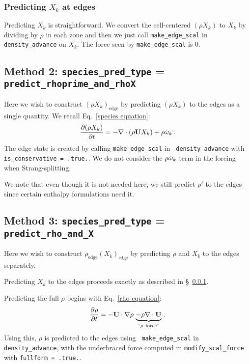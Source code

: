 \subsubsection{Predicting $X_k$ at edges}
\label{sec:pert:predict_X}
Predicting $X_k$ is straightforward.  We convert the cell-centered
$(\rho X_k)$ to $X_k$ by dividing by $\rho$ in each zone and then we
just call {\tt make\_edge\_scal} in {\tt density\_advance} on $X_k$.
The force seen by {\tt make\_edge\_scal} is 0.


\subsection{Method 2: {\tt species\_pred\_type} = {\tt predict\_rhoprime\_and\_rhoX}}

Here we wish to construct $(\rho X_k)_\mathrm{edge}$ by predicting
$(\rho X_k)$ to the edges as a single quantity.  We recall
Eq.~\ref{species equation}:
\begin{equation}
\frac{\partial(\rho X_k)}{\partial t} =
  -\nabla \cdot (\rho {\bf U} X_k) + \rho \dot{\omega}_k \, . \nonumber
\end{equation}
The edge state is created by calling {\tt make\_edge\_scal} in {\tt
  density\_advance} with {\tt is\_conservative = .true.}.
We do not consider the $\rho \dot{\omega}_k$ term in the forcing when
Strang-splitting.


We note that even though it is not needed here, we still predict
$\rho'$ to the edges since certain enthalpy formulations need it.


\subsection{Method 3: {\tt species\_pred\_type} = {\tt predict\_rho\_and\_X}}

Here we wish to construct $\rho_\mathrm{edge} (X_k)_\mathrm{edge}$
by predicting $\rho$ and $X_k$ to the edges separately.

Predicting $X_k$ to the edges proceeds exactly as described in
\S~\ref{sec:pert:predict_X}.  

Predicting the full $\rho$ begins with Eq.~\ref{rho equation}:
\begin{equation}
\frac{\partial\rho}{\partial t} 
= -{\bf U}\cdot\nabla\rho \, \underbrace{- \rho\nabla\cdot{\bf U}}_{``\rho~\text{force''}} \, . \label{rho equation labeled}
\end{equation}
Using this, $\rho$ is predicted to the edges using {\tt
  make\_edge\_scal} in {\tt density\_advance}, with the underbraced
force computed in {\tt modify\_scal\_force} with {\tt fullform =
  .true.}.

